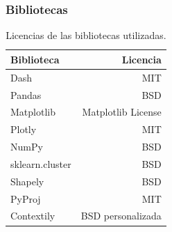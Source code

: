 \subsubsection{Bibliotecas}

\begin{table}[H]
\centering
\begin{tabular}{lr}
\toprule
Biblioteca & Licencia \\ 
\midrule
Dash & MIT \\ 
Pandas & BSD \\ 
Matplotlib & Matplotlib License \\ 
Plotly & MIT \\ 
NumPy & BSD \\ 
sklearn.cluster & BSD \\ 
Shapely & BSD \\ 
PyProj & MIT \\ 
Contextily & BSD personalizada \\ 
\bottomrule
\end{tabular}
\caption{Licencias de las bibliotecas utilizadas.}
\end{table}

